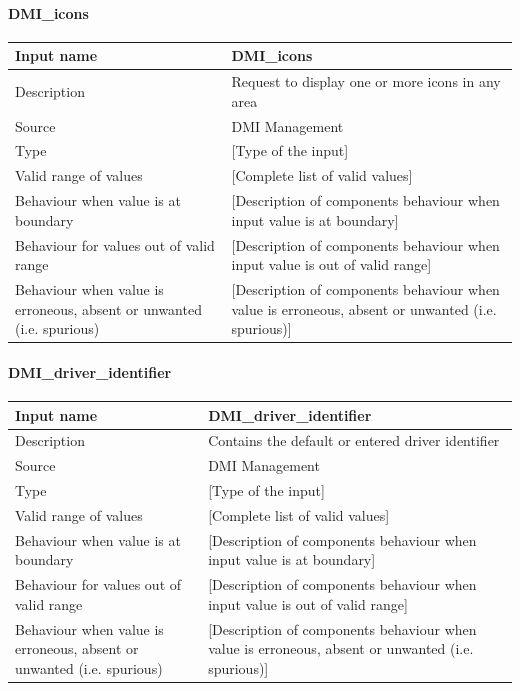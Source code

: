 \paragraph{DMI\_icons}

\begin{longtable}{p{}p{}}
\toprule
Input name				& DMI\_icons \\
\midrule
Description				& Request to display one or more icons in any area \\
\midrule
Source					& DMI Management \\ 
\midrule
Type					& [Type of the input] \\
\midrule
Valid range of values	& [Complete list of valid values] \\
\midrule
Behaviour when value is at boundary	& [Description of components behaviour when input value is at boundary] \\
\midrule
Behaviour for values out of valid range	& [Description of components behaviour when input value is out of valid range] \\
\midrule
Behaviour when value is erroneous, absent or unwanted (i.e. spurious) & [Description of components behaviour when value is erroneous, absent or unwanted (i.e. spurious)] \\
\bottomrule
\end{longtable}

\paragraph{DMI\_driver\_identifier}

\begin{longtable}{p{}p{}}
\toprule
Input name				& DMI\_driver\_identifier \\
\midrule
Description				& Contains the default or entered driver identifier \\
\midrule
Source					& DMI Management \\ 
\midrule
Type					& [Type of the input] \\
\midrule
Valid range of values	& [Complete list of valid values] \\
\midrule
Behaviour when value is at boundary	& [Description of components behaviour when input value is at boundary] \\
\midrule
Behaviour for values out of valid range	& [Description of components behaviour when input value is out of valid range] \\
\midrule
Behaviour when value is erroneous, absent or unwanted (i.e. spurious) & [Description of components behaviour when value is erroneous, absent or unwanted (i.e. spurious)] \\
\bottomrule
\end{longtable}

